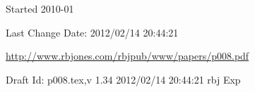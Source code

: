 \documentclass[10pt,titlepage]{book}
\begin{document}
\backmatter

%




\label{index}
{\twocolumn[]
{\small\printindex}}

\vfill

\tiny{
Started 2010-01

Last Change $ $Date: 2012/02/14 20:44:21 $ $

\href{http://www.rbjones.com/rbjpub/www/papers/p008.pdf}{http://www.rbjones.com/rbjpub/www/papers/p008.pdf}

Draft $ $Id: p008.tex,v 1.34 2012/02/14 20:44:21 rbj Exp $ $
}%
\end{document}
